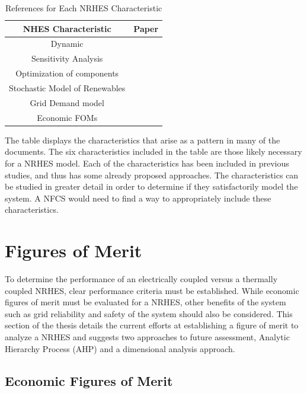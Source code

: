 \documentclass[12pt]{UIdahoMastersThesis}
\begin{document}
\begin{table}[h!]
\centering
\caption{References for Each NRHES Characteristic}
\begin{tabular}{ ||c | c|| }
 \hline
 NHES Characteristic & Paper \\ [0.5ex]
 \hline \hline
 Dynamic & \cite{Garcia2013, Du2014, Kazimi, Garcia2016}\\
 \hline
 Sensitivity Analysis & \cite{Shropshire2011, Rehman2010, Adaramola2014, Chen2016}\\
 \hline
 Optimization of components & \cite{Chen2016,Ozcan2016, Forsberg2009,Garcia2015,Aumeier2011}\\
 \hline
 Stochastic Model of Renewables & \cite{Rabiti2015, Garcia2016,Locatelli2015}\\
 \hline
 Grid Demand model & \cite{Forsberg2013, Garcia2016,Garcia2013,Ruth2014,Chen2016}\\
 \hline
  Economic FOMs & \cite{Garcia2016,Chen2016,Rabiti2015,Epiney2016,Bragg-Sitton2014}\\
 \hline
\end{tabular}
\label{table:1}
\end{table}

The table displays the characteristics that arise as a pattern in many of the documents.  The six characteristics included in the table are those likely necessary for a NRHES model.  Each of the characteristics has been included in previous studies, and thus has some already proposed approaches.  The characteristics can be studied in greater detail in order to determine if they satisfactorily model the system. A NFCS would need to find a way to appropriately include these characteristics.

\chapter{Figures of Merit}
To determine the performance of an electrically coupled versus a thermally coupled NRHES, clear performance criteria must be established.  While economic figures of merit must be evaluated for a NRHES, other benefits of the system such as grid reliability and safety of the system should also be considered. This section of the thesis details the current efforts at establishing a figure of merit to analyze a NRHES and suggests two approaches to future assessment, Analytic Hierarchy Process (AHP) and a dimensional analysis approach.
\section{Economic Figures of Merit}
\end{document}

